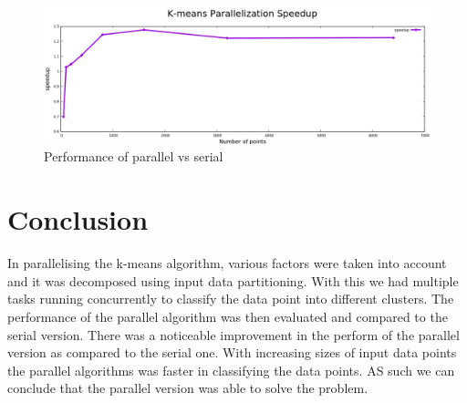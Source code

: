 \documentclass[12pt]{article}
\begin{document}
    		\begin{figure}
    			\begin{center}
    				\includegraphics[scale=0.4]{speedup.png}
    			\end{center}
    			\caption{Performance of parallel vs serial}
    		\end{figure}
    	
	\section{Conclusion}
    	\begin{flushleft}
			In parallelising the k-means algorithm, various factors were taken into account and it was decomposed using input data partitioning. With this we had multiple tasks running concurrently to classify the data point into different clusters. The performance of the parallel algorithm was then evaluated and compared to the serial version. There was a noticeable improvement in the perform of the parallel version as compared to the serial one. With increasing sizes of input data points the parallel algorithms was faster in classifying the data points. AS such we can conclude that the parallel version was able to solve the problem.
    	\end{flushleft}
\end{document}
